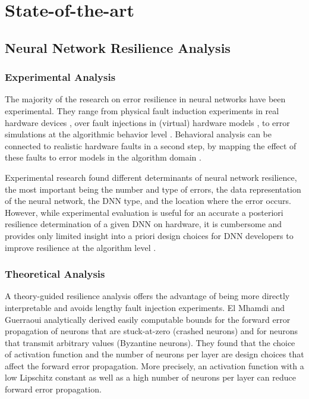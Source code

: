 \section{State-of-the-art}

\subsection{Neural Network Resilience Analysis}

\subsubsection{Experimental Analysis}
The majority of the research on error resilience in neural networks have been experimental. They range from physical fault induction experiments in real hardware devices \cite{dos2018analyzing, whatmough2018dnn}, over fault injections in (virtual) hardware models \cite{azizimazreah2018tolerating, li2017understanding, salami2018resilience, dos2018analyzing}, to error simulations at the algorithmic behavior level \cite{marques2017unreliable, reagen2018ares, li2018smartshuttle}. Behavioral analysis can be connected to realistic hardware faults in a second step, by mapping the effect of these faults to error models in the algorithm domain \cite{piuri2001analysis}.

Experimental research found different determinants of neural network resilience, the most important being the number and type of errors, the data representation of the neural network, the DNN type, and the location where the error occurs. However, while experimental evaluation is useful for an accurate a posteriori resilience determination of a given DNN on hardware, it is cumbersome and provides only limited insight into a priori design choices for DNN developers to improve resilience at the algorithm level \cite{schorn2020automated}.

\subsubsection{Theoretical Analysis}
A theory-guided resilience analysis offers the advantage of being more directly interpretable and avoids lengthy fault injection experiments. El Mhamdi and Guerraoui \cite{guerraoui2017neurons} analytically derived easily computable bounds for the forward error propagation of neurons that are stuck-at-zero (crashed neurons) and for neurons that transmit arbitrary values (Byzantine neurons). They found that the choice of activation function and the number of neurons per layer are design choices that affect the forward error propagation. More precisely, an activation function with a low Lipschitz constant as well as a high number of neurons per layer can reduce forward error propagation.

